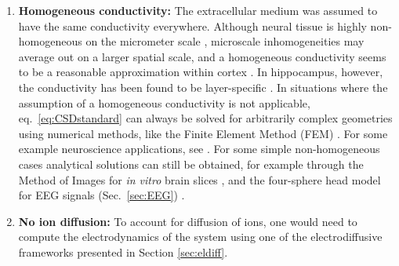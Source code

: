 \documentclass[preprint,11pt,authoryear]{elsarticle}
\newcommand{\hlb}[2][blue]{ {\sethlcolor{#1} \hl{#2}} }
\newcommand{\hlj}[2][OliveGreen]{ {\sethlcolor{#1} \hl{#2}} }
\newcommand{\hlR}[2][red]{ {\sethlcolor{#1} \hl{#2}} }
\newcommand{\ghnote}[1]{\color{white}{\hlb{GH: #1 }}\color{black}}
\newcommand{\gen}[1]{\color{white}{\hlR{GTE: #1 }}\color{black}}
\newcommand{\tvnnote}[1]{\color{white}{\hlj{TVN: #1 }}\color{black}}
\begin{document}
\begin{enumerate}

\item {\bf Homogeneous  conductivity:} The extracellular medium was assumed to have the same conductivity everywhere. Although neural tissue is highly non-homogeneous on the micrometer scale \citep{Nicholson1998}, microscale inhomogeneities may average out on a larger spatial scale, and a homogeneous conductivity seems to be a reasonable approximation within cortex \citep{Logothetis2007}. In hippocampus, however, the conductivity has been found to be layer-specific \citep{lopez2001}. In situations where the assumption of a homogeneous conductivity is not applicable, eq.~\ref{eq:CSDstandard} can always be solved for arbitrarily complex geometries using numerical methods, like the Finite Element Method (FEM) \citep{Logg2012}. For some example neuroscience applications, see \cite{Moffitt2005, Frey2009, Joucla2012, Haufe2015, Ness2015, Buccino2019b, Obien2019}. For some simple non-homogeneous cases analytical solutions can still be obtained, for example through the Method of Images for {\it in vitro} brain slices \citep{Ness2015}, and the four-sphere head model for EEG signals (Sec.~\ref{sec:EEG}) \citep{Naess2017}.

\item {\bf No ion diffusion:} To account for diffusion of ions, one would need to compute the electrodynamics of the system using one of the electrodiffusive frameworks presented in Section \ref{sec:eldiff}.

\end{enumerate}
\end{document}
